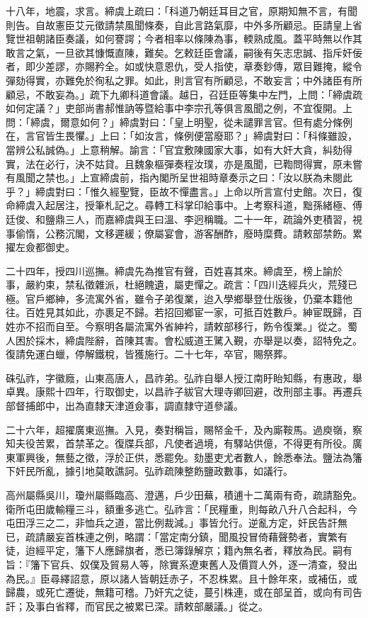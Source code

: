 \begin{pinyinscope}
十八年，地震，求言。締虞上疏曰：「科道乃朝廷耳目之官，原期知無不言，有聞則告。自故憲臣艾元徵請禁風聞條奏，自此言路氣靡，中外多所顧忌。臣請皇上省覽世祖朝諸臣奏議，如何謇諤；今者相率以條陳為事，輭熟成風。蓋平時無以作其敢言之氣，一旦欲其慷慨直陳，難矣。乞敕廷臣會議，嗣後有矢志忠誠、指斥奸佞者，即少差謬，亦賜矜全。如或快意恩仇，受人指使，章奏鈔傳，眾目難掩，縱令彈劾得實，亦難免於徇私之罪。如此，則言官有所顧忌，不敢妄言；中外諸臣有所顧忌，不敢妄為。」疏下九卿科道會議。越日，召廷臣等集中左門，上問：「締虞疏如何定議？」吏部尚書郝惟訥等暨給事中李宗孔等俱言風聞之例，不宜復開。上問：「締虞，爾意如何？」締虞對曰：「皇上明聖，從未譴罪言官。但有處分條例在，言官皆生畏懼。」上曰：「如汝言，條例便當廢耶？」締虞對曰：「科條雖設，當辨公私誠偽。」上意稍解。諭言：「官宜敷陳國家大事，如有大奸大貪，糾劾得實，法在必行，決不姑貸。且魏象樞彈奏程汝璞，亦是風聞，已鞫問得實，原未嘗有風聞之禁也。」上宣締虞前，指內閣所呈世祖時章奏示之曰：「汝以朕為未閱此乎？」締虞對曰：「惟久經聖覽，臣故不憚盡言。」上命以所言宣付史館。次日，復命締虞入起居注，授筆札記之。尋轉工科掌印給事中。上考察科道，黜孫緒極、傅廷俊、和鹽鼎三人，而嘉締虞與王曰溫、李迥稱職。二十一年，疏論外吏積習，視事偷惰，公務沉閣，文移遲緩；僚屬宴會，游客酬酢，廢時糜費。請敕部禁飭。累擢左僉都御史。

二十四年，授四川巡撫。締虞先為推官有聲，百姓喜其來。締虞至，榜上諭於事，嚴約束，禁私徵雜派，杜絕餽遺，屬吏憚之。疏言：「四川迭經兵火，荒殘已極。官戶鄉紳，多流寓外省，雖令子弟復業，迨入學鄉舉登仕版後，仍棄本籍他往。百姓見其如此，亦裹足不歸。若招回鄉宦一家，可抵百姓數戶。紳宦既歸，百姓亦不招而自至。今察明各屬流寓外省紳衿，請敕部移行，飭令復業。」從之。蜀人困於採木，締虞陛辭，首陳其害。會松威道王騭入覲，亦舉是以奏，詔特免之。復請免運白蠟，停解鐵稅，皆獲施行。二十七年，卒官，賜祭葬。

硃弘祚，字徽廕，山東高唐人，昌祚弟。弘祚自舉人授江南盱眙知縣，有惠政，舉卓異。康熙十四年，行取御史，以昌祚子紱官大理寺卿回避，改刑部主事。再遷兵部督捕郎中，出為直隸天津道僉事，調直隸守道參議。

二十六年，超擢廣東巡撫。入見，奏對稱旨，賜帑金千，及內廝鞍馬。過庾嶺，察知夫役苦累，首禁革之。復牒兵部，凡使者過境，有驛站供億，不得更有所役。廣東軍興後，無藝之徵，浮於正供，悉罷免。劾墨吏尤者數人，餘悉奉法。鹽法為籓下奸民所亂，據引地莫敢譙訶。弘祚疏陳整飭鹽政數事，如議行。

高州屬縣吳川，瓊州屬縣臨高、澄邁，戶少田蕪，積逋十二萬兩有奇，疏請豁免。衛所屯田歲輸糧三斗，額重多逃亡。弘祚言：「民糧重，則每畝八升八合起科，今屯田浮三之二，非恤兵之道，當比例裁減。」事皆允行。逆亂方定，奸民告訐無已，疏請嚴妄首株連之例，略謂：「當定南分鎮，聞風投冒倚藉聲勢者，實繁有徒，迨經平定，籓下人應歸旗者，悉已簿錄解京；籍內無名者，釋放為民。嗣有旨：『籓下官兵、奴僕及貿易人等，除實系遼東舊人及價買人外，逐一清查，發出為民。』臣尋繹詔意，原以諸人皆朝廷赤子，不忍株累。且十餘年來，或補伍，或歸農，或死亡遷徙，無籍可稽。乃奸宄之徒，蔓引株連，或在部呈首，或向有司告訐；及事白省釋，而官民之被累已深。請敕部嚴議。」從之。


\end{pinyinscope}
